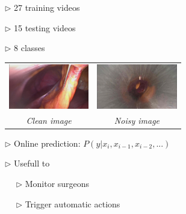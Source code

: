 \documentclass[landscape,a0paper,fontscale=0.292]{baposter}
\begin{document}
\begin{poster}
{$\triangleright$ 27 training videos

$\triangleright$ 15 testing videos

$\triangleright$ 8 classes


 \begin{tabular}{cc}
\includegraphics[width=3.5cm]{../slides/images/m2cai.jpg}
& 
\includegraphics[width=3.5cm]{../slides/images/m2cai-2.jpg} 
\\
{\em Clean image} & {\em Noisy image}
\end{tabular}

\vspace{1mm}

$\triangleright$ Online prediction: $P(y | x_i, x_{i-1}, x_{i-2}, ...)$
 

$\triangleright$ Usefull to

~~ $\triangleright$ Monitor surgeons

~~ $\triangleright$ Trigger automatic actions


}

% 
% 
% 
% 
% 
% 
% 
% 
% 

\end{poster}
\end{document}
